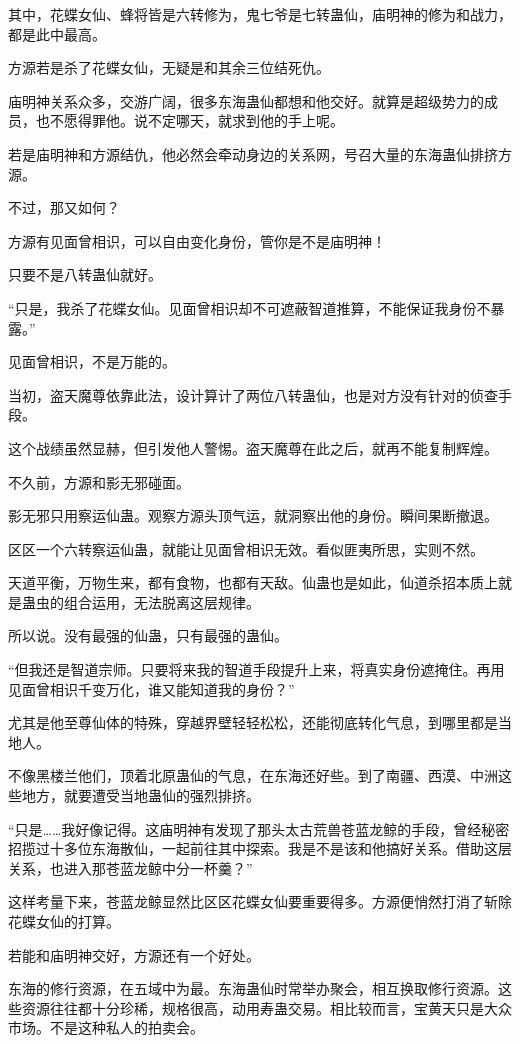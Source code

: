 \begin{this_body}
其中，花蝶女仙、蜂将皆是六转修为，鬼七爷是七转蛊仙，庙明神的修为和战力，都是此中最高。

方源若是杀了花蝶女仙，无疑是和其余三位结死仇。

庙明神关系众多，交游广阔，很多东海蛊仙都想和他交好。就算是超级势力的成员，也不愿得罪他。说不定哪天，就求到他的手上呢。

若是庙明神和方源结仇，他必然会牵动身边的关系网，号召大量的东海蛊仙排挤方源。

不过，那又如何？

方源有见面曾相识，可以自由变化身份，管你是不是庙明神！

只要不是八转蛊仙就好。

“只是，我杀了花蝶女仙。见面曾相识却不可遮蔽智道推算，不能保证我身份不暴露。”

见面曾相识，不是万能的。

当初，盗天魔尊依靠此法，设计算计了两位八转蛊仙，也是对方没有针对的侦查手段。

这个战绩虽然显赫，但引发他人警惕。盗天魔尊在此之后，就再不能复制辉煌。

不久前，方源和影无邪碰面。

影无邪只用察运仙蛊。观察方源头顶气运，就洞察出他的身份。瞬间果断撤退。

区区一个六转察运仙蛊，就能让见面曾相识无效。看似匪夷所思，实则不然。

天道平衡，万物生来，都有食物，也都有天敌。仙蛊也是如此，仙道杀招本质上就是蛊虫的组合运用，无法脱离这层规律。

所以说。没有最强的仙蛊，只有最强的蛊仙。

“但我还是智道宗师。只要将来我的智道手段提升上来，将真实身份遮掩住。再用见面曾相识千变万化，谁又能知道我的身份？”

尤其是他至尊仙体的特殊，穿越界壁轻轻松松，还能彻底转化气息，到哪里都是当地人。

不像黑楼兰他们，顶着北原蛊仙的气息，在东海还好些。到了南疆、西漠、中洲这些地方，就要遭受当地蛊仙的强烈排挤。

“只是……我好像记得。这庙明神有发现了那头太古荒兽苍蓝龙鲸的手段，曾经秘密招揽过十多位东海散仙，一起前往其中探索。我是不是该和他搞好关系。借助这层关系，也进入那苍蓝龙鲸中分一杯羹？”

这样考量下来，苍蓝龙鲸显然比区区花蝶女仙要重要得多。方源便悄然打消了斩除花蝶女仙的打算。

若能和庙明神交好，方源还有一个好处。

东海的修行资源，在五域中为最。东海蛊仙时常举办聚会，相互换取修行资源。这些资源往往都十分珍稀，规格很高，动用寿蛊交易。相比较而言，宝黄天只是大众市场。不是这种私人的拍卖会。


\end{this_body}
